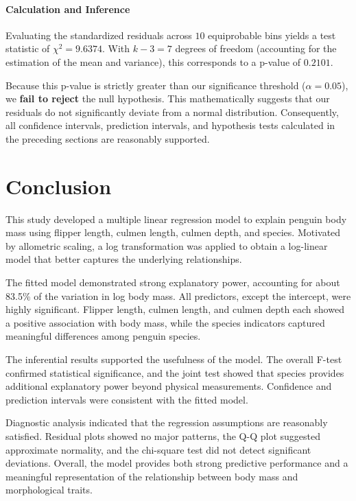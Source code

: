 \documentclass[12pt]{article}
\begin{document}
\paragraph{Calculation and Inference}
Evaluating the standardized residuals across $10$ equiprobable
bins yields a test statistic of $\chi^2 = 9.6374$. With
$k-3 = 7$ degrees of freedom (accounting for the estimation
of the mean and variance), this corresponds to a p-value of
$0.2101$.

Because this p-value is strictly greater than our significance
threshold ($\alpha = 0.05$), we \textbf{fail to reject} the
null hypothesis. This mathematically suggests that our residuals
do not significantly deviate from a normal distribution.
Consequently, all confidence intervals, prediction intervals,
and hypothesis tests calculated in the preceding sections are
reasonably supported.

\section{Conclusion}

This study developed a multiple linear regression model to
explain penguin body mass using flipper length, culmen
length, culmen depth, and species. Motivated by allometric
scaling, a log transformation was applied to obtain a
log-linear model that better captures the underlying
relationships.

The fitted model demonstrated strong explanatory power,
accounting for about 83.5\% of the variation in log body
mass. All predictors, except the intercept, were highly
significant. Flipper length, culmen length, and culmen depth
each showed a positive association with body mass, while the
species indicators captured meaningful differences among
penguin species.

The inferential results supported the usefulness of the
model. The overall F-test confirmed statistical significance,
and the joint test showed that species provides additional
explanatory power beyond physical measurements. Confidence
and prediction intervals were consistent with the fitted
model.

Diagnostic analysis indicated that the regression assumptions
are reasonably satisfied. Residual plots showed no major
patterns, the Q-Q plot suggested approximate normality, and
the chi-square test did not detect significant deviations.
Overall, the model provides both strong predictive
performance and a meaningful representation of the
relationship between body mass and morphological traits.
\end{document}
